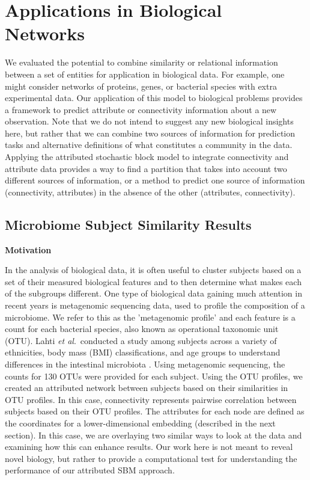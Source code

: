 \section{Applications in Biological Networks}
We evaluated the potential to combine similarity or relational information between a set of entities for application in biological data. For example, one might consider networks of proteins, genes, or bacterial species with extra experimental data. Our application of this model to biological problems provides a framework to predict attribute or connectivity information about a new observation.  Note that we do not intend to suggest any new biological insights here, but rather that we can combine two sources of information for prediction tasks and alternative definitions of what constitutes a community in the data. Applying the attributed stochastic block model to integrate connectivity and attribute data provides a way to find a partition that takes into account two different sources of information, or a method to predict one source of information (connectivity, attributes) in the absence of the other (attributes, connectivity). 

\subsection{Microbiome Subject Similarity Results}

{\bf Motivation}

In the analysis of biological data, it is often useful to cluster subjects based on a set of their measured biological features and to then determine what makes each of the subgroups different. One type of biological data gaining much attention in recent years is metagenomic sequencing data, used to profile the composition of a microbiome. We refer to this as the 'metagenomic profile' and each feature is a count for each bacterial species, also known as operational taxonomic unit (OTU). Lahti \emph{et al}.\ conducted a study among subjects across a variety of ethnicities, body mass (BMI) classifications, and age groups to understand differences in the intestinal microbiota \cite{microbiomedata}. Using metagenomic sequencing, the counts for 130 OTUs were provided for each subject. Using the OTU profiles, we created an attributed network between subjects based on their similarities in OTU profiles. In this case, connectivity represents pairwise correlation between subjects based on their OTU profiles. The attributes for each node are defined as the coordinates for a lower-dimensional embedding (described in the next section). In this case, we are overlaying two similar ways to look at the data and examining how this can enhance results. Our work here is not meant to reveal novel biology, but rather to provide a computational test for understanding the performance of our attributed SBM approach.  

